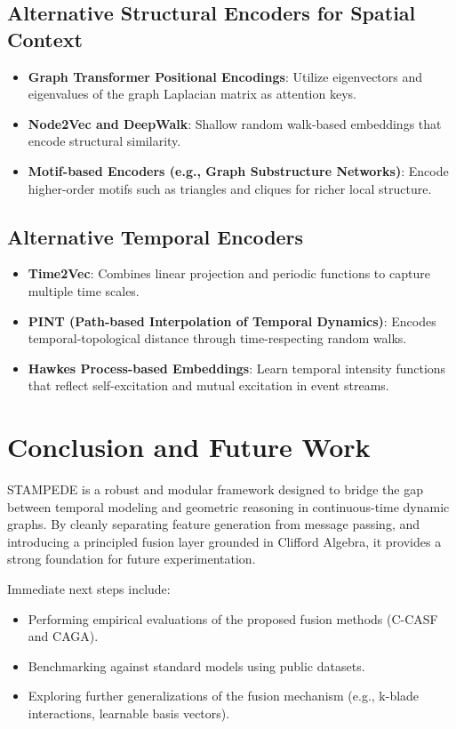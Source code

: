 \documentclass[11pt, a4paper]{article}
\begin{document}
\subsection{Alternative Structural Encoders for Spatial Context}
\begin{itemize}
    \item \textbf{Graph Transformer Positional Encodings}: Utilize eigenvectors and eigenvalues of the graph Laplacian matrix as attention keys.
    \item \textbf{Node2Vec and DeepWalk}: Shallow random walk-based embeddings that encode structural similarity.
    \item \textbf{Motif-based Encoders (e.g., Graph Substructure Networks)}: Encode higher-order motifs such as triangles and cliques for richer local structure.
\end{itemize}

\subsection{Alternative Temporal Encoders}
\begin{itemize}
    \item \textbf{Time2Vec}: Combines linear projection and periodic functions to capture multiple time scales.
    \item \textbf{PINT (Path-based Interpolation of Temporal Dynamics)}: Encodes temporal-topological distance through time-respecting random walks.
    \item \textbf{Hawkes Process-based Embeddings}: Learn temporal intensity functions that reflect self-excitation and mutual excitation in event streams.
\end{itemize}

\section{Conclusion and Future Work}
STAMPEDE is a robust and modular framework designed to bridge the gap between temporal modeling and geometric reasoning in continuous-time dynamic graphs. By cleanly separating feature generation from message passing, and introducing a principled fusion layer grounded in Clifford Algebra, it provides a strong foundation for future experimentation.

Immediate next steps include:

\begin{itemize}
    \item Performing empirical evaluations of the proposed fusion methods (C-CASF and CAGA).
    \item Benchmarking against standard models using public datasets.
    \item Exploring further generalizations of the fusion mechanism (e.g., k-blade interactions, learnable basis vectors).
\end{itemize}
\end{document}
